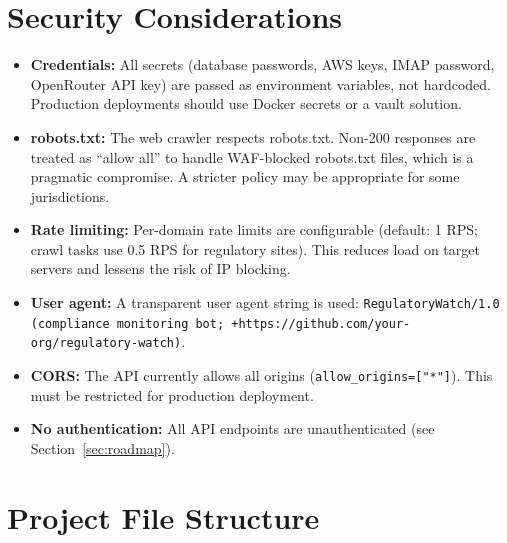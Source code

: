 \documentclass[12pt,a4paper]{article}
\begin{document}
\section{Security Considerations}

\begin{itemize}[noitemsep]
  \item \textbf{Credentials:} All secrets (database passwords, AWS keys, IMAP password, OpenRouter API key) are passed as environment variables, not hardcoded. Production deployments should use Docker secrets or a vault solution.
  \item \textbf{robots.txt:} The web crawler respects robots.txt. Non-200 responses are treated as ``allow all'' to handle WAF-blocked robots.txt files, which is a pragmatic compromise. A stricter policy may be appropriate for some jurisdictions.
  \item \textbf{Rate limiting:} Per-domain rate limits are configurable (default: 1 RPS; crawl tasks use 0.5 RPS for regulatory sites). This reduces load on target servers and lessens the risk of IP blocking.
  \item \textbf{User agent:} A transparent user agent string is used: \texttt{RegulatoryWatch/1.0 (compliance monitoring bot; +https://github.com/your-org/regulatory-watch)}.
  \item \textbf{CORS:} The API currently allows all origins (\texttt{allow\_origins=["*"]}). This must be restricted for production deployment.
  \item \textbf{No authentication:} All API endpoints are unauthenticated (see Section~\ref{sec:roadmap}).
\end{itemize}

\section{Project File Structure}
\end{document}
